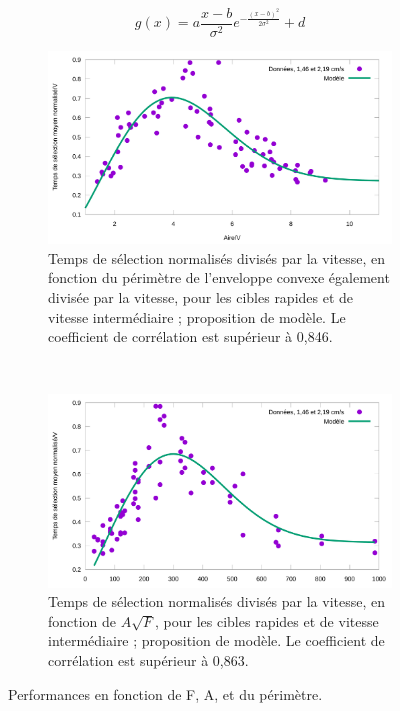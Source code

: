 	\begin{equation}
		g(x) = a\frac{x-b}{\sigma^{2}}e^{-\frac{(x-b)^{2}}{2\sigma^{2}} } + d
		\label{eq:pdfModel}
	\end{equation}


	\begin{figure}[!htb]
		\begin{subfigure}[t]{0.485\textwidth}
			\centering
			\includegraphics[width=\textwidth]{figures/ch4/timeVareaFit}
			\caption[Temps de sélection/V en fonction de $\mathbb{E}(\mathcal{P}(ec))/V$ et modèle]{Temps de sélection normalisés divisés par la vitesse, en fonction du périmètre de l'enveloppe convexe également divisée par la vitesse, pour les cibles rapides et de vitesse intermédiaire ; proposition de modèle. Le coefficient de corrélation est supérieur à 0,846.}
			\label{fig:timeVareaFit}
		\end{subfigure}
		~
		\begin{subfigure}[t]{0.485\textwidth}
			\centering
			\includegraphics[width=\textwidth]{figures/ch4/timeVafFit}
			\caption[Temps de sélection/V en fonction de $A\sqrt{F}$ et modèle]{Temps de sélection normalisés divisés par la vitesse, en fonction de $A\sqrt{F}$, pour les cibles rapides et de vitesse intermédiaire ; proposition de modèle. Le coefficient de corrélation est supérieur à 0,863.}
			\label{fig:timeVafFit}	
		\end{subfigure}
		\caption[Performances en fonction de F, A, et du périmètre]{Performances en fonction de F, A, et du périmètre.}
		\label{fig:timeVafAndPerimFits}
	\end{figure}
	
